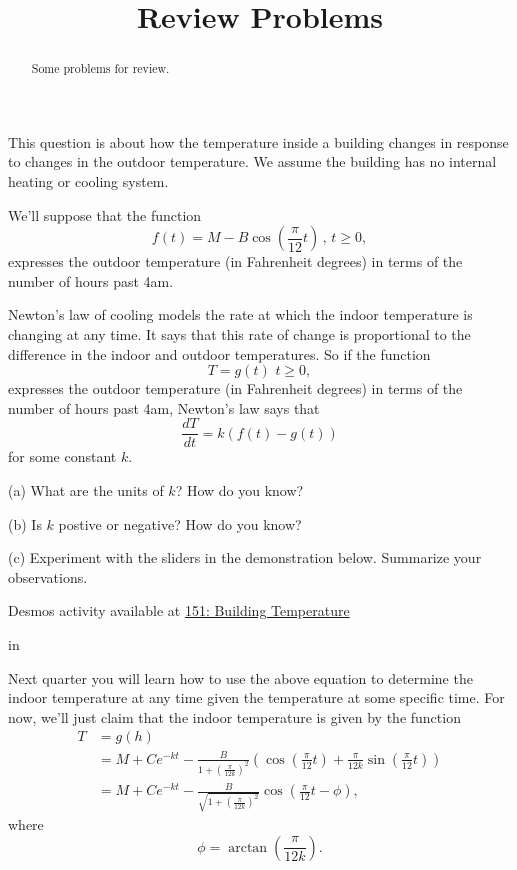 \documentclass{ximera}
\title{Review Problems}
\newcommand{\pskip}{\vskip 0.1 in}
\begin{document}
\begin{abstract}
Some problems for review.
\end{abstract}
\maketitle


\begin{question}  \label{Q:DFDbgttgt44}
This question is about how the temperature inside a building changes in response to changes in the outdoor temperature. We assume the building has no internal heating or cooling system.

We'll suppose that the function 
\[
   f(t) = M -B\cos \left( \frac{\pi}{12}t \right) \, , \, t\geq 0,
\]
expresses the outdoor temperature (in Fahrenheit degrees) in terms of the number of hours past 4am.

Newton's law of cooling models the rate at which the indoor temperature is changing at any time. It says that this rate of change is proportional to the difference in the indoor and outdoor temperatures. So if the function
\[
    T = g(t) \, \, t\geq 0,
\]
expresses the outdoor temperature (in Fahrenheit degrees) in terms of the number of hours past 4am, Newton's law says that
\begin{equation}  \label{Eq:Newton}
    \frac{dT}{dt} = k (f(t)-g(t)) 
\end{equation}
for some constant $k$.

(a) What are the units of $k$? How do you know?

(b) Is $k$ postive or negative? How do you know?

(c) Experiment with the sliders in the demonstration below. Summarize your observations.


\begin{onlineOnly}
    \begin{center}
\end{center}
\end{onlineOnly}

Desmos activity available at \href{https://www.desmos.com/calculator/oag9lhvgo5}{151: Building Temperature}

\pskip

Next quarter you will learn how to use the above equation to determine the indoor temperature at any time given the temperature at some specific time. For now, we'll just claim that the indoor temperature is given by the function
\begin{align*}
   T      &= g(h)  \\
           & = M + Ce^{-kt} - \frac{B}{1+(\frac{\pi}{12k})^2} \left(  \cos \left( \frac{\pi}{12}t \right)  + \frac{\pi}{12k}  \sin \left( \frac{\pi}{12}t \right) \right)  \\
                   &=  M + Ce^{-kt} - \frac{B}{\sqrt{1+(\frac{\pi}{12k})^2}} \cos \left( \frac{\pi}{12}t - \phi  \right) ,
\end{align*}
where
\[
  \phi = \arctan \left( \frac{\pi}{12k}     \right) .
\]




\end{question}
\end{document}
